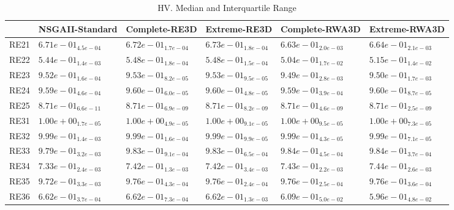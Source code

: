 \documentclass{article}
\begin{document}
\begin{table}
\caption{HV. Median and Interquartile Range}
\label{table: HV}
\centering
\begin{scriptsize}
\begin{tabular}{llllll}
\hline & NSGAII-Standard & Complete-RE3D & Extreme-RE3D & Complete-RWA3D &  Extreme-RWA3D\\
\hline 
RE21 & $  6.71e-01_{ 4.5e-04}$ & \cellcolor{gray25}$  6.72e-01_{ 1.7e-04}$ & \cellcolor{gray95}$  6.73e-01_{ 1.8e-04}$ & $  6.63e-01_{ 2.0e-03}$ & $  6.64e-01_{ 2.1e-03}$ \\
RE22 & $  5.44e-01_{ 1.4e-03}$ & \cellcolor{gray25}$  5.48e-01_{ 1.8e-04}$ & \cellcolor{gray95}$  5.48e-01_{ 1.5e-04}$ & $  5.04e-01_{ 1.7e-02}$ & $  5.15e-01_{ 1.4e-02}$ \\
RE23 & $  9.52e-01_{ 1.6e-04}$ & \cellcolor{gray95}$  9.53e-01_{ 8.2e-05}$ & \cellcolor{gray25}$  9.53e-01_{ 9.5e-05}$ & $  9.49e-01_{ 2.8e-03}$ & $  9.50e-01_{ 1.7e-03}$ \\
RE24 & $  9.59e-01_{ 4.6e-04}$ & \cellcolor{gray25}$  9.60e-01_{ 6.0e-05}$ & \cellcolor{gray95}$  9.60e-01_{ 4.8e-05}$ & $  9.59e-01_{ 3.9e-04}$ & $  9.60e-01_{ 8.7e-05}$ \\
RE25 & \cellcolor{gray95}$  8.71e-01_{ 6.6e-11}$ & $  8.71e-01_{ 6.9e-09}$ & $  8.71e-01_{ 8.2e-09}$ & $  8.71e-01_{ 4.6e-09}$ & \cellcolor{gray25}$  8.71e-01_{ 2.5e-09}$ \\
RE31 & \cellcolor{gray95}$  1.00e+00_{ 1.7e-05}$ & $  1.00e+00_{ 4.9e-05}$ & \cellcolor{gray25}$  1.00e+00_{ 9.1e-05}$ & $  1.00e+00_{ 9.5e-05}$ & $  1.00e+00_{ 7.3e-05}$ \\
RE32 & $  9.99e-01_{ 1.4e-03}$ & $  9.99e-01_{ 1.6e-04}$ & $  9.99e-01_{ 9.9e-05}$ & \cellcolor{gray25}$  9.99e-01_{ 4.3e-05}$ & \cellcolor{gray95}$  9.99e-01_{ 7.1e-05}$ \\
RE33 & $  9.79e-01_{ 3.2e-03}$ & $  9.83e-01_{ 9.1e-04}$ & $  9.83e-01_{ 6.5e-04}$ & \cellcolor{gray95}$  9.84e-01_{ 4.5e-04}$ & \cellcolor{gray25}$  9.84e-01_{ 3.7e-04}$ \\
RE34 & $  7.33e-01_{ 2.4e-03}$ & $  7.42e-01_{ 1.3e-03}$ & $  7.42e-01_{ 3.4e-03}$ & \cellcolor{gray25}$  7.43e-01_{ 2.2e-03}$ & \cellcolor{gray95}$  7.44e-01_{ 2.6e-03}$ \\
RE35 & $  9.72e-01_{ 3.3e-03}$ & \cellcolor{gray25}$  9.76e-01_{ 4.3e-04}$ & $  9.76e-01_{ 2.4e-04}$ & \cellcolor{gray95}$  9.76e-01_{ 2.5e-04}$ & $  9.76e-01_{ 3.6e-04}$ \\
RE36 & \cellcolor{gray95}$  6.62e-01_{ 3.7e-04}$ & \cellcolor{gray25}$  6.62e-01_{ 7.3e-04}$ & $  6.62e-01_{ 1.3e-03}$ & $  6.09e-01_{ 5.0e-02}$ & $  5.96e-01_{ 4.8e-02}$ \\

\end{tabular}
\end{scriptsize}
\end{table}
\end{document}
